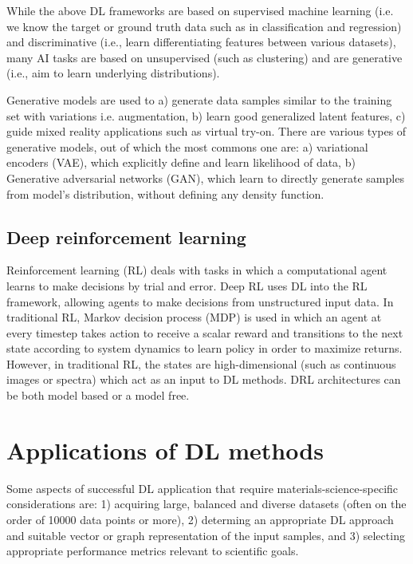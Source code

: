 \documentclass[pdflatex,sn-mathphys]{sn-jnl}%
\theoremstyle{thmstyleone}%
\theoremstyle{thmstyletwo}%
\theoremstyle{thmstylethree}%
\begin{document}
While the above DL frameworks are based on supervised machine learning (i.e. we know the target or ground truth data such as in classification and regression) and discriminative (i.e., learn differentiating features between various datasets), many AI tasks are based on unsupervised (such as clustering) and are generative (i.e., aim to learn underlying distributions). 

Generative models are used to a) generate data samples similar to the training set with variations i.e. augmentation, b) learn good generalized latent features, c) guide mixed reality applications such as virtual try-on. There are various types of generative models, out of which the most commons one are: a) variational encoders (VAE), which explicitly define and learn likelihood of data, b) Generative adversarial networks (GAN), which learn to directly generate samples from model's distribution, without defining any density function.

\subsection{Deep reinforcement learning}\label{sec:rl}

Reinforcement learning (RL) deals with tasks in which a computational agent learns to make decisions by trial and error. Deep RL uses DL into the RL framework, allowing agents to make decisions from unstructured input data. In traditional RL, Markov decision process (MDP) is used in which an agent at every timestep takes action to receive a scalar reward and transitions to the next state according to system dynamics to learn policy in order to maximize returns. However, in traditional RL, the states are high-dimensional (such as continuous images or spectra) which act as an input to DL methods. DRL architectures can be both model based or a model free.

\section{Applications of DL methods}\label{sec:applications}
Some aspects of successful DL application that require materials-science-specific considerations are:
1) acquiring large, balanced and diverse datasets (often on the order of 10000 data points or more),
2) determing an appropriate DL approach and suitable vector or graph representation of the input samples, and
3) selecting appropriate performance metrics relevant to scientific goals.
\end{document}
